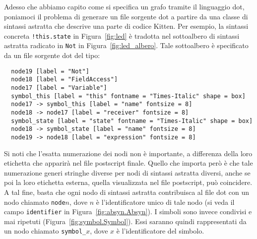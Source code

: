 Adesso che abbiamo capito come si specifica un grafo tramite il linguaggio
dot, poniamoci il problema di generare un file sorgente dot a partire da una
classe di sintassi astratta che descrive una parte di codice Kitten.
Per esempio, la sintassi concreta
\texttt{!this.state} in Figura~\ref{fig:led} \`e tradotta nel sottoalbero
di sintassi astratta radicato in \texttt{Not} in Figura~\ref{fig:led_albero}.
Tale sottoalbero \`e specificato da un file sorgente dot del tipo:
%
\begin{verbatim}
  node19 [label = "Not"]
  node18 [label = "FieldAccess"]
  node17 [label = "Variable"]
  symbol_this [label = "this" fontname = "Times-Italic" shape = box]
  node17 -> symbol_this [label = "name" fontsize = 8]
  node18 -> node17 [label = "receiver" fontsize = 8]
  symbol_state [label = "state" fontname = "Times-Italic" shape = box]
  node18 -> symbol_state [label = "name" fontsize = 8]
  node19 -> node18 [label = "expression" fontsize = 8]
\end{verbatim}
%
Si noti che l'esatta numerazione dei nodi non \`e importante, a differenza
della loro etichetta che apparir\`a nel file postscript finale.
Quello che importa per\`o \`e che tale numerazione generi stringhe diverse
per nodi di sintassi astratta diversi, anche se poi la loro etichetta esterna,
quella visualizzata nel file postscript,
pu\`o coincidere. A tal fine, basta che ogni nodo di sintassi
astratta contribuisca al file dot con un nodo chiamato \texttt{node}$n$,
dove $n$ \`e l'identificatore unico di tale nodo (si veda il campo
\texttt{identifier} in Figura~\ref{fig:absyn.Absyn}). I simboli sono
invece condivisi e mai ripetuti (Figura~\ref{fig:symbol.Symbol}).
Essi saranno quindi rappresentati da un nodo chiamato \texttt{symbol\_}$x$,
dove $x$ \`e l'identificatore del simbolo.

